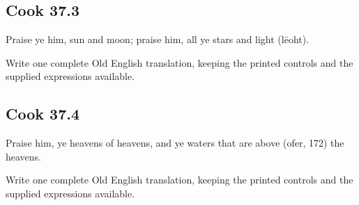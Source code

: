 \par\begin{minipage}{\linewidth}\raggedright
\subsection*{Cook 37.3}

Praise ye him, sun and moon; praise him, all ye stars and light (lēoht).

Write one complete Old English translation, keeping the printed controls and the supplied expressions available.

\end{minipage}\par\addvspace{4pt}

\par\begin{minipage}{\linewidth}\raggedright
\subsection*{Cook 37.4}

Praise him, ye heavens of heavens, and ye waters that are above (ofer, 172) the heavens.

Write one complete Old English translation, keeping the printed controls and the supplied expressions available.

\end{minipage}\par\addvspace{4pt}

